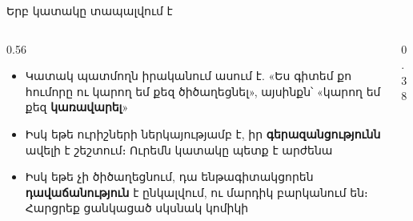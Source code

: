 \begin{frame}{Երբ կատակը տապալվում է}
  \begin{columns}[c]
    \begin{column}{0.56\textwidth}
      \begin{itemize}
        \item Կատակ պատմողն իրականում ասում է. «Ես գիտեմ քո հումորը ու կարող եմ քեզ ծիծաղեցնել», այսինքն՝ «կարող եմ քեզ \textbf{կառավարել}»
        \item<2-> Իսկ եթե ուրիշների ներկայությամբ է, իր \textbf{գերազանցությունն} ավելի է շեշտում։ Ուրեմն կատակը պետք է արժենա
        \item<3-> Իսկ եթե չի ծիծաղեցնում, դա ենթագիտակցորեն \textbf{դավաճանություն} է ընկալվում, ու մարդիկ բարկանում են։ Հարցրեք ցանկացած սկսնակ կոմիկի
      \end{itemize}
    \end{column}
    \begin{column}{0.38\textwidth}
      \centering
      \par\medskip
    \end{column}
  \end{columns}
\end{frame}
